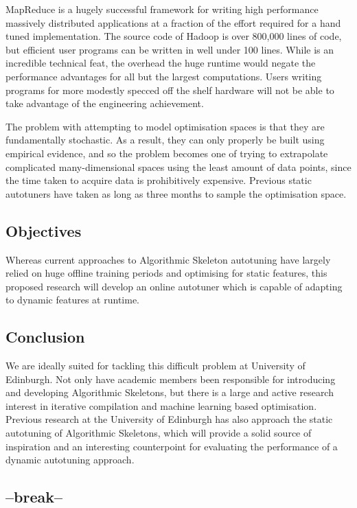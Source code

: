 MapReduce is a hugely successful framework for writing high
performance massively distributed applications at a fraction of the
effort required for a hand tuned implementation. The source code of
Hadoop is over 800,000 lines of code, but efficient user programs can
be written in well under 100 lines. While is an incredible technical
feat, the overhead the huge runtime would negate the performance
advantages for all but the largest computations. Users writing
programs for more modestly specced off the shelf hardware will not be
able to take advantage of the engineering achievement.

The problem with attempting to model optimisation spaces is that they
are fundamentally stochastic. As a result, they can only properly be
built using empirical evidence, and so the problem becomes one of
trying to extrapolate complicated many-dimensional spaces using the
least amount of data points, since the time taken to acquire data is
prohibitively expensive. Previous static autotuners have taken as long
as three months to sample the optimisation space.

\subsection{Objectives}
Whereas current approaches to Algorithmic Skeleton autotuning have
largely relied on huge offline training periods and optimising for
static features, this proposed research will develop an online
autotuner which is capable of adapting to dynamic features at runtime.

\subsection{Conclusion}

We are ideally suited for tackling this difficult problem at
University of Edinburgh. Not only have academic members been
responsible for introducing and developing Algorithmic Skeletons, but
there is a large and active research interest in iterative compilation
and machine learning based optimisation. Previous research at the
University of Edinburgh has also approach the static autotuning of
Algorithmic Skeletons, which will provide a solid source of
inspiration and an interesting counterpoint for evaluating the
performance of a dynamic autotuning approach.

\subsection*{--break--}

